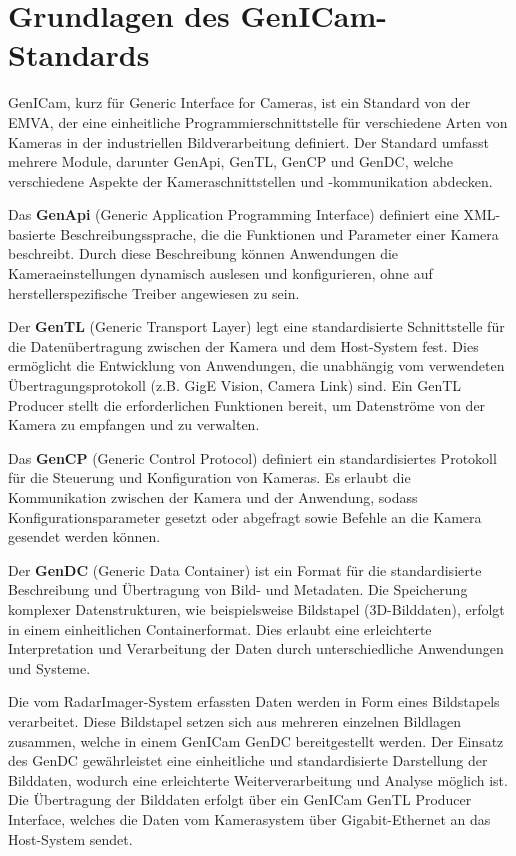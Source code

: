 \section{Grundlagen des GenICam-Standards}

GenICam, kurz für \glqq Generic Interface for Cameras\grqq, ist ein Standard von der \ac{EMVA}, der eine einheitliche 
Programmierschnittstelle für verschiedene Arten von Kameras in der industriellen Bildverarbeitung definiert. Der Standard umfasst 
mehrere Module, darunter GenApi, GenTL, GenCP und GenDC, welche verschiedene Aspekte der Kameraschnittstellen und -kommunikation abdecken.

Das \textbf{GenApi} (Generic Application Programming Interface) definiert eine XML-basierte Beschreibungssprache, die die Funktionen und Parameter 
einer Kamera beschreibt. Durch diese Beschreibung können Anwendungen die Kameraeinstellungen dynamisch auslesen und konfigurieren, ohne 
auf herstellerspezifische Treiber angewiesen zu sein.

Der \textbf{GenTL} (Generic Transport Layer) legt eine standardisierte Schnittstelle für die Datenübertragung zwischen der Kamera und dem Host-System fest. 
Dies ermöglicht die Entwicklung von Anwendungen, die unabhängig vom verwendeten Übertragungsprotokoll (z.B. GigE Vision, Camera Link) sind. 
Ein GenTL Producer stellt die erforderlichen Funktionen bereit, um Datenströme von der Kamera zu empfangen und zu verwalten.

Das \textbf{GenCP} (Generic Control Protocol) definiert ein standardisiertes Protokoll für die Steuerung und Konfiguration von Kameras. Es erlaubt die 
Kommunikation zwischen der Kamera und der Anwendung, sodass Konfigurationsparameter gesetzt oder abgefragt sowie Befehle an die Kamera gesendet werden können.

Der \textbf{GenDC} (Generic Data Container) ist ein Format für die standardisierte Beschreibung und Übertragung von Bild- und Metadaten. Die Speicherung komplexer Datenstrukturen, 
wie beispielsweise Bildstapel (3D-Bilddaten), erfolgt in einem einheitlichen Containerformat. Dies erlaubt eine erleichterte Interpretation und Verarbeitung der Daten durch 
unterschiedliche Anwendungen und Systeme.

Die vom RadarImager-System erfassten Daten werden in Form eines Bildstapels verarbeitet. Diese Bildstapel setzen sich aus mehreren einzelnen Bildlagen zusammen, 
welche in einem GenICam GenDC bereitgestellt werden. Der Einsatz des GenDC gewährleistet eine einheitliche und standardisierte Darstellung der Bilddaten, wodurch eine 
erleichterte Weiterverarbeitung und Analyse möglich ist. Die Übertragung der Bilddaten erfolgt über ein GenICam GenTL Producer Interface, welches die Daten vom Kamerasystem 
über Gigabit-Ethernet an das Host-System sendet.

\citep{BalluffRIWebsite} \citep{EMVA2024}